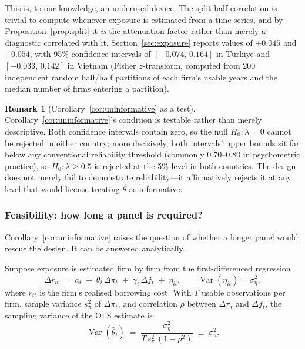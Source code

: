 \documentclass[review,12pt,authoryear]{elsarticle}
\theoremstyle{plain}
\theoremstyle{definition}
\newtheorem{remark}{Remark}
\newcommand{\Var}{\operatorname{Var}}
\begin{document}
This is, to our knowledge, an underused device. The split-half correlation is
trivial to compute whenever exposure is estimated from a time series, and by
Proposition~\ref{prop:split} it \emph{is} the attenuation factor rather than
merely a diagnostic correlated with it. Section~\ref{sec:exposure} reports
values of $+0.045$ and $+0.054$, with 95\% confidence intervals of
$[-0.074,\,0.164]$ in T\"{u}rkiye and $[-0.033,\,0.142]$ in Vietnam (Fisher
$z$-transform, computed from 200 independent random half/half partitions of
each firm's usable years and the median number of firms entering a partition).

\begin{remark}[Corollary~\ref{cor:uninformative} as a test]
\label{rem:test}
Corollary~\ref{cor:uninformative}'s condition is testable rather than merely
descriptive. Both confidence intervals contain zero, so the null
$H_0:\lambda=0$ cannot be rejected in either country; more decisively, both
intervals' upper bounds sit far below any conventional reliability threshold
(commonly $0.70$--$0.80$ in psychometric practice), so $H_0:\lambda\ge0.5$ is
rejected at the 5\% level in both countries. The design does not merely fail
to demonstrate reliability---it affirmatively rejects it at any level that
would license treating $\widehat{\theta}$ as informative.
\end{remark}

\subsubsection{Feasibility: how long a panel is required?}

Corollary~\ref{cor:uninformative} raises the question of whether a longer panel
would rescue the design. It can be answered analytically.

Suppose exposure is estimated firm by firm from the first-differenced
regression
\begin{equation}
\Delta r_{it} \;=\; a_i \;+\; \theta_i\,\Delta\pi_t \;+\; \gamma_i\,\Delta f_t
\;+\; \eta_{it},
\qquad \Var(\eta_{it})=\sigma^2_\eta ,
\label{eq:beta}
\end{equation}
where $r_{it}$ is the firm's realised borrowing cost. With $T$ usable
observations per firm, sample variance $s^2_\pi$ of $\Delta\pi_t$, and
correlation $\rho$ between $\Delta\pi_t$ and $\Delta f_t$, the sampling variance
of the OLS estimate is
\begin{equation}
\Var(\widehat{\theta}_i)\;=\;\frac{\sigma^2_\eta}{T\,s^2_\pi\,(1-\rho^2)}
\;\equiv\;\sigma^2_u .
\label{eq:sampvar}
\end{equation}
\end{document}
